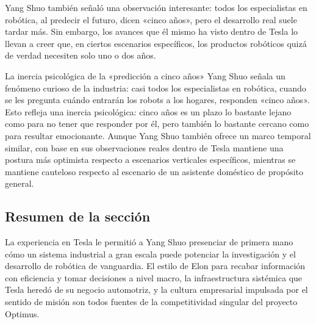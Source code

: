 Yang Shuo también señaló una observación interesante: todos los especialistas en robótica, al predecir el futuro, dicen «cinco años», pero el desarrollo real suele tardar más. Sin embargo, los avances que él mismo ha visto dentro de Tesla lo llevan a creer que, en ciertos escenarios específicos, los productos robóticos quizá de verdad necesiten solo uno o dos años.

\begin{knowledgebox}{La inercia psicológica de la «predicción a cinco años»}
Yang Shuo señala un fenómeno curioso de la industria: casi todos los especialistas en robótica, cuando se les pregunta cuándo entrarán los robots a los hogares, responden «cinco años». Esto refleja una inercia psicológica: cinco años es un plazo lo bastante lejano como para no tener que responder por él, pero también lo bastante cercano como para resultar emocionante. Aunque Yang Shuo también ofrece un marco temporal similar, con base en sus observaciones reales dentro de Tesla mantiene una postura más optimista respecto a escenarios verticales específicos, mientras se mantiene cauteloso respecto al escenario de un asistente doméstico de propósito general.
\end{knowledgebox}

\subsection{Resumen de la sección}

La experiencia en Tesla le permitió a Yang Shuo presenciar de primera mano cómo un sistema industrial a gran escala puede potenciar la investigación y el desarrollo de robótica de vanguardia. El estilo de Elon para recabar información con eficiencia y tomar decisiones a nivel macro, la infraestructura sistémica que Tesla heredó de su negocio automotriz, y la cultura empresarial impulsada por el sentido de misión son todos fuentes de la competitividad singular del proyecto Optimus.
